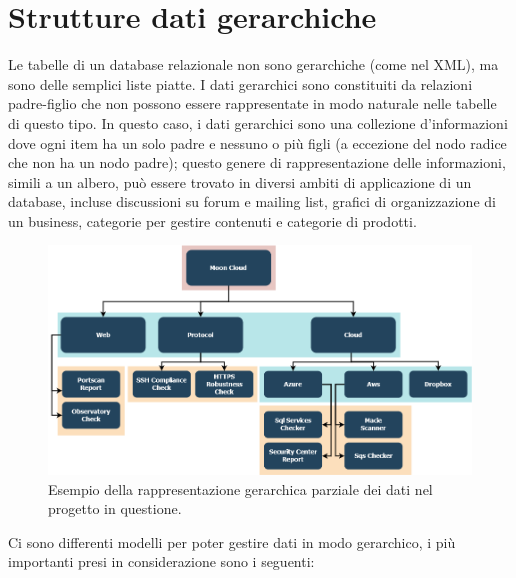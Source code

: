 \section{Strutture dati gerarchiche}
Le tabelle di un database relazionale non sono gerarchiche (come nel XML), ma sono delle semplici liste piatte. I dati gerarchici sono 
constituiti da relazioni padre-figlio che non possono essere rappresentate in modo naturale nelle tabelle di questo tipo.
In questo caso, i dati gerarchici sono una collezione d'informazioni dove ogni item ha un solo padre e nessuno o più figli 
(a eccezione del nodo radice che non ha un nodo padre); questo genere di rappresentazione delle informazioni, simili a un albero, 
può essere trovato in diversi ambiti di applicazione di un database, incluse discussioni su forum e mailing list, grafici di 
organizzazione di un business, categorie per gestire contenuti e categorie di prodotti.
%
\begin{figure}[ht!]
    \centering
    \includegraphics[scale=0.46]{images/MC_Rec_Tree.png}
    \caption{Esempio della rappresentazione gerarchica parziale dei dati nel progetto in questione.}
    \label{fig:MC_Rec_Tree}
\end{figure}
\hfill\break
Ci sono differenti modelli per poter gestire dati in modo gerarchico, i più importanti presi in considerazione sono i seguenti:
%

